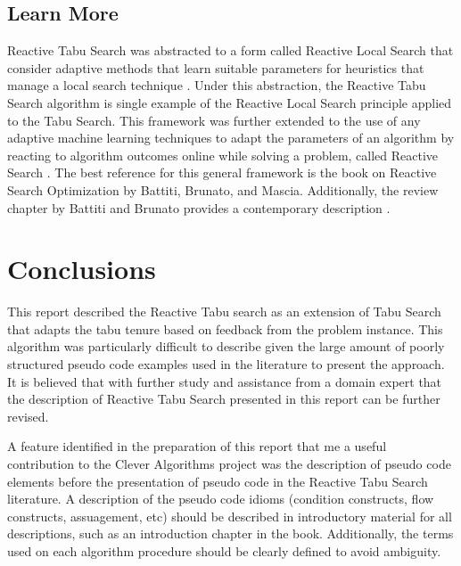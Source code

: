 \documentclass[a4paper, 11pt]{article}
\begin{document}
\subsection{Learn More}
Reactive Tabu Search was abstracted to a form called Reactive Local Search that consider adaptive methods that learn suitable parameters for heuristics that manage a local search technique \cite{Battiti1995, Battiti2001}. Under this abstraction, the Reactive Tabu Search algorithm is single example of the Reactive Local Search principle applied to the Tabu Search. 
This framework was further extended to the use of any adaptive machine learning techniques to adapt the parameters of an algorithm by reacting to algorithm outcomes online while solving a problem, called Reactive Search \cite{Battiti1996}. The best reference for this general framework is the book on Reactive Search Optimization by Battiti, Brunato, and Mascia\cite{Battiti2008}. Additionally, the review chapter by Battiti and Brunato provides a contemporary description \cite{Battiti2009}.


% 
% 
\section{Conclusions}
\label{sec:conclusions}
This report described the Reactive Tabu search as an extension of Tabu Search that adapts the tabu tenure based on feedback from the problem instance.
This algorithm was particularly difficult to describe given the large amount of poorly structured pseudo code examples used in the literature to present the approach. It is believed that with further study and assistance from a domain expert that the description of Reactive Tabu Search presented in this report can be further revised.

A feature identified in the preparation of this report that me a useful contribution to the Clever Algorithms project was the description of pseudo code elements before the presentation of pseudo code in the Reactive Tabu Search literature. A description of the pseudo code idioms (condition constructs, flow constructs, assuagement, etc) should be described in introductory material for all descriptions, such as an introduction chapter in the book. Additionally, the terms used on each algorithm procedure should be clearly defined to avoid ambiguity.
\end{document}
